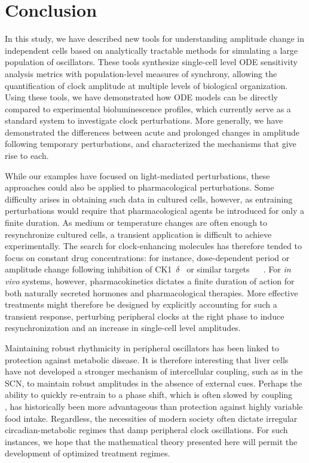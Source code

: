 \documentclass[11pt, letterpaper]{article}
\providecommand{\DIFadd}[1]{{\protect\color{blue}#1}} %
\providecommand{\DIFaddbegin}{} %
\providecommand{\DIFaddend}{} %
\begin{document}
\section*{Conclusion}

In this study, we have described new tools for understanding amplitude change in \DIFaddbegin \DIFadd{independent }\DIFaddend cells based on analytically tractable methods for simulating a large population of oscillators.
These tools synthesize single-cell level ODE sensitivity analysis metrics with population-level measures of synchrony, allowing the quantification of clock amplitude at \DIFaddbegin \DIFadd{multiple }\DIFaddend levels of biological organization.
Using these tools, we have demonstrated how ODE models can be directly compared to experimental bioluminescence profiles, which currently serve as a standard system to investigate clock perturbations.
More generally, we have demonstrated the differences between acute and prolonged changes in amplitude following temporary perturbations, and characterized the mechanisms \DIFaddbegin \DIFadd{that }\DIFaddend give rise to each.

\DIFaddbegin \DIFadd{While our examples have focused on light-mediated perturbations, these approaches could also be applied to pharmacological perturbations.
Some difficulty arises in obtaining such data in cultured cells, however, as entraining perturbations would require that pharmacological agents be introduced for only a finite duration.
As medium or temperature changes are often enough to resynchronize cultured cells, a transient application is difficult to achieve experimentally.
The search for clock-enhancing molecules has therefore tended to focus on constant drug concentrations: for instance, dose-dependent period or amplitude change following inhibition of CK1\mbox{%
$\delta$
}%
or similar targets \mbox{%
\cite{Chen2013}
}%
.
For }{\itshape \DIFadd{in vivo}} \DIFadd{systems, however, pharmacokinetics dictates a finite duration of action for both naturally secreted hormones and pharmacological therapies.
More effective treatments might therefore be designed by explicitly accounting for such a transient response, perturbing peripheral clocks at the right phase to induce resynchronization and an increase in single-cell level amplitudes.
}

\DIFaddend Maintaining robust rhythmicity in peripheral oscillators has been linked to protection against metabolic disease.
It is therefore interesting that liver cells have not developed a stronger mechanism of intercellular coupling, such as in the SCN, to maintain robust amplitudes in the absence of external \DIFaddbegin \DIFadd{cues}\DIFaddend .
Perhaps the ability to quickly re-entrain to a phase shift, which is often slowed by coupling \DIFaddbegin \DIFadd{\mbox{%
\cite{Abraham2010}
}%
}\DIFaddend , has historically been more advantageous than protection against highly variable food intake.
Regardless, the necessities of modern society often dictate irregular circadian-metabolic regimes that damp peripheral clock oscillations.
For such instances, we hope that the mathematical theory presented here will permit the development of optimized \DIFaddbegin \DIFadd{treatment regimes}\DIFaddend .
\end{document}
